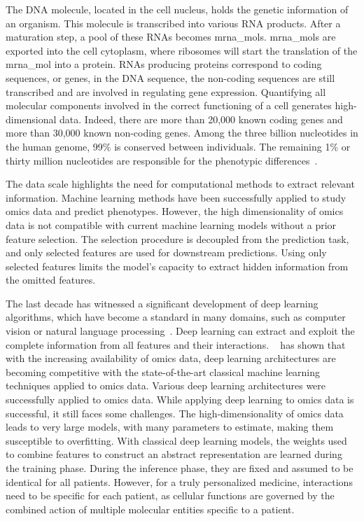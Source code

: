 \documentclass[../main.tex]{subfiles}
\begin{document}
	The DNA molecule, located in the cell nucleus, holds the genetic information of an organism.
	This molecule is transcribed into various RNA products.
	After a maturation step, a pool of these RNAs becomes \glspl{mrna_mol}.
	\glspl{mrna_mol} are exported into the cell cytoplasm, where ribosomes will start the translation of the \gls{mrna_mol} into a protein.
	RNAs producing proteins correspond to coding sequences, or genes,  in the DNA sequence, the non-coding sequences are still transcribed and are involved in regulating gene expression.
	Quantifying all molecular components involved in the correct functioning of a cell generates high-dimensional data.
	Indeed, there are more than 20,000 known coding genes and more than 30,000 known non-coding genes.
	Among the three billion nucleotides in the human genome, 99\% is conserved between individuals.
	The remaining 1\% or thirty million nucleotides are responsible for the phenotypic differences~\cite{GeneticVariation}.

	The data scale highlights the need for computational methods to extract relevant information.
	Machine learning methods have been successfully applied to study omics data and predict phenotypes.
	However, the high dimensionality of omics data is not compatible with current machine learning models without a prior feature selection.
	The selection procedure is decoupled from the prediction task, and only selected features are used for downstream predictions.
	Using only selected features limits the model's capacity to extract hidden information from the omitted features.

	The last decade has witnessed a significant development of deep learning algorithms, which have become a standard in many domains, such as computer vision or natural language processing~\cite{lecunDeepLearning2015}.
	Deep learning can extract and exploit the complete information from all features and their interactions.
	\citeauthor{Hanczar2022}~\cite{Hanczar2022} has shown that with the increasing availability of omics data, deep learning architectures are becoming competitive with the state-of-the-art classical machine learning techniques applied to omics data.
	Various deep learning architectures were successfully applied to omics data.
	While applying deep learning to omics data is successful, it still faces some challenges.
	The high-dimensionality of omics data leads to very large models, \ie{}with many parameters to estimate, making them susceptible to overfitting.
	With classical deep learning models, the weights used to combine features to construct an abstract representation are learned during the training phase.
	During the inference phase, they are fixed and assumed to be identical for all patients.
	However, for a truly personalized medicine, interactions need to be specific for each patient, as cellular functions are governed by the combined action of multiple molecular entities specific to a patient.
\end{document}
